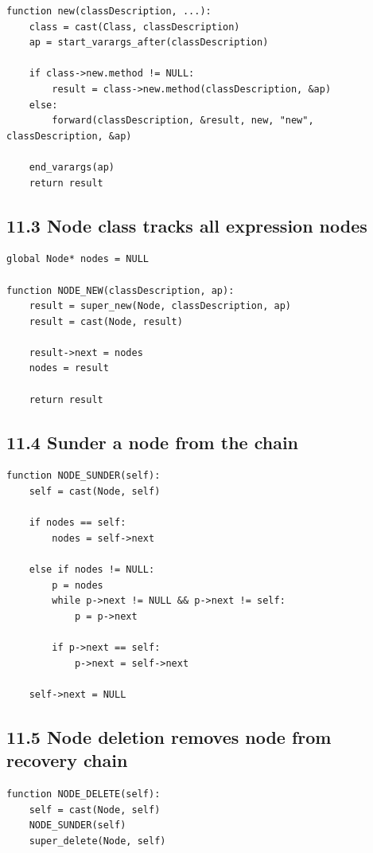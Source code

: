 \documentclass[11pt]{article}
\begin{document}
\begin{verbatim}
function new(classDescription, ...):
    class = cast(Class, classDescription)
    ap = start_varargs_after(classDescription)

    if class->new.method != NULL:
        result = class->new.method(classDescription, &ap)
    else:
        forward(classDescription, &result, new, "new", classDescription, &ap)

    end_varargs(ap)
    return result
\end{verbatim}

\subsection{11.3 Node class tracks all expression
nodes}\label{node-class-tracks-all-expression-nodes}

\begin{verbatim}
global Node* nodes = NULL

function NODE_NEW(classDescription, ap):
    result = super_new(Node, classDescription, ap)
    result = cast(Node, result)

    result->next = nodes
    nodes = result

    return result
\end{verbatim}

\subsection{11.4 Sunder a node from the
chain}\label{sunder-a-node-from-the-chain}

\begin{verbatim}
function NODE_SUNDER(self):
    self = cast(Node, self)

    if nodes == self:
        nodes = self->next

    else if nodes != NULL:
        p = nodes
        while p->next != NULL && p->next != self:
            p = p->next

        if p->next == self:
            p->next = self->next

    self->next = NULL
\end{verbatim}

\subsection{11.5 Node deletion removes node from recovery
chain}\label{node-deletion-removes-node-from-recovery-chain}

\begin{verbatim}
function NODE_DELETE(self):
    self = cast(Node, self)
    NODE_SUNDER(self)
    super_delete(Node, self)
\end{verbatim}
\end{document}
